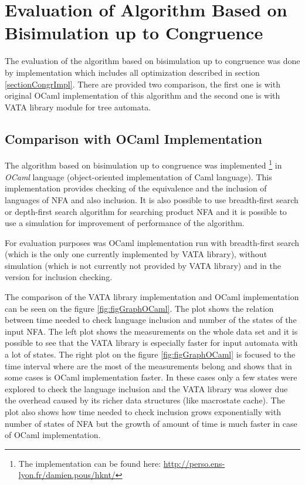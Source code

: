 \section{Evaluation of Algorithm Based on Bisimulation up to Congruence}
The evaluation of the algorithm based on bisimulation up to congruence was done by implementation which includes all optimization described in section 
\ref{sectionCongrImpl}. There are provided two comparison, the first one is with original OCaml implementation of this algorithm and the second one is with
VATA library module for tree automata.

\subsection{Comparison with OCaml Implementation}
The algorithm based on bisimulation up to congruence was implemented 
\footnote{The implementation can be found here: \url{http://perso.ens-lyon.fr/damien.pous/hknt/}} 
in \emph{OCaml} language (object-oriented implementation of Caml language). 
This implementation provides checking of the equivalence
and the inclusion of languages of NFA and also inclusion. It is also possible to use breadth-first search or depth-first search algorithm for searching 
product NFA and it is possible to use a simulation for improvement of performance of the algorithm.

For evaluation purposes was OCaml implementation run with breadth-first search (which is the only one currently implemented by VATA library), without
simulation (which is not currently not provided by VATA library) and in the version for inclusion checking.

The comparison of the VATA library implementation and OCaml implementation can be seen on the figure \ref{fig:figGraphOCaml}. 
The plot shows the relation between time needed to check language inclusion and number of the states of the input NFA.
The left plot shows the measurements on the whole data set and it is possible to see that the VATA library is especially faster for input automata with a lot
of states. The right plot on the figure \ref{fig:figGraphOCaml} is focused to the time interval where are the most of the measurements belong and 
shows that in some cases is OCaml implementation faster. In these cases only a few states were explored to 
check the language inclusion and the VATA library was slower due the overhead caused by its richer data structures (like macrostate cache). The plot also shows
how time needed to check inclusion grows exponentially with number of states of NFA but 
the growth of amount of time is much faster in case of OCaml implementation.

